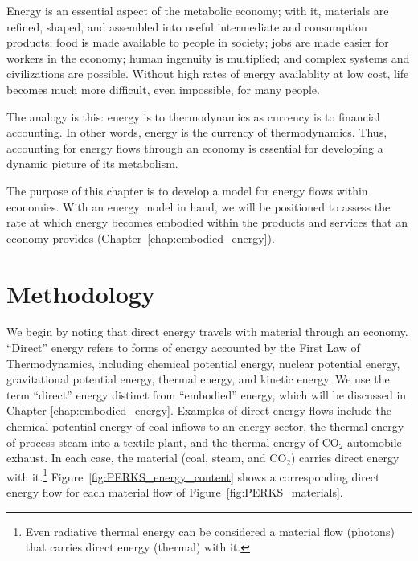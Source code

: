 Energy is an essential aspect of the metabolic economy;
with it, materials are refined, shaped, and assembled
into useful intermediate and consumption products; 
food is made available to people in society; 
jobs are made easier for workers in the economy;
human ingenuity is multiplied;
and complex systems and civilizations are possible.
Without high rates of energy availablity at low cost,
life becomes much more difficult, even impossible, for many people.

The analogy is this: 
energy is to thermodynamics as currency is to financial accounting.
In other words, energy is the currency of thermodynamics.
Thus, accounting for energy flows through an economy
is essential for developing a dynamic picture 
of its metabolism.

The purpose of this chapter is to develop 
a model for energy flows within economies.
With an energy model in hand, we will be positioned 
to assess the rate at which
energy becomes embodied within the products and 
services that an economy provides
(Chapter~\ref{chap:embodied_energy}).


\section{Methodology}
\label{sec:energy_methodology}

We begin by noting that direct energy travels 
with material through an economy.
``Direct'' energy refers to forms of energy accounted by the 
First Law of Thermodynamics,
including chemical potential energy, 
nuclear potential energy, 
gravitational potential energy,
thermal energy, 
and kinetic energy.
We use the term ``direct'' energy distinct from ``embodied'' energy, 
which will be discussed in Chapter \ref{chap:embodied_energy}.
Examples of direct energy flows include 
the chemical potential energy of coal inflows to an energy sector, 
the thermal energy of process steam into a textile plant, and
the thermal energy of CO$_2$ automobile exhaust.
In each case, the material (coal, steam, and CO$_2$) 
carries direct energy with it.\footnote{Even 
radiative thermal energy
can be considered a material flow (photons) that carries
direct energy (thermal) with it.}
Figure~\ref{fig:PERKS_energy_content} shows a corresponding 
direct energy flow for each material flow of Figure~\ref{fig:PERKS_materials}.

